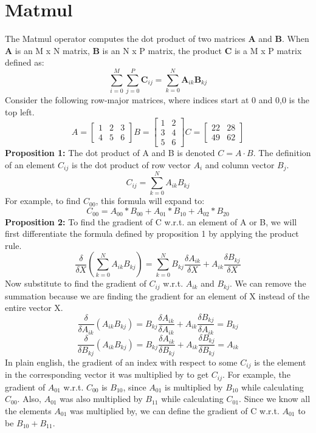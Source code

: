 \documentclass{report}
\begin{document}
        \section{Matmul}
            The Matmul operator computes the dot product of two matrices \textbf{A} and \textbf{B}. When \textbf{A} is an M x N 
            matrix, \textbf{B} is an N x P matrix, the product \textbf{C} is a M x P matrix defined as: 
            $$\sum_{i=0}^{M}\sum_{j=0}^{P}\boldsymbol{C}_{ij} = \sum_{k=0}^{N} \boldsymbol{A}_{ik}\boldsymbol{B}_{kj}$$
            Consider the following row-major matrices, where indices start at 0 and 0,0 is the top left. 
            $$
                A = \begin{bmatrix}1 & 2 & 3\\ 4 & 5 & 6 \end{bmatrix}
                B = \begin{bmatrix}1 & 2 \\ 3 & 4 \\ 5 & 6 \end{bmatrix}
                C = \begin{bmatrix} 22 & 28 \\ 49 & 62\end{bmatrix}
            $$
            \textbf{Proposition 1:}
            The dot product of A and B is denoted $C = A \cdot B$. The definition of an element $C_{ij}$ is the dot product of row vector $A_i$ and column vector $B_j$. 
            $$C_{ij} = \sum_{k=0}^{N} A_{ik}B_{kj}$$
            For example, to find $C_{00}$, this formula will expand to:
            $$C_{00} = A_{00} * B_{00} + A_{01} * B_{10} + A_{02} * B_{20}$$
            \textbf{Proposition 2:}
            To find the gradient of C w.r.t. an element of A or B, we will first differentiate the formula defined by proposition 1 by applying the product rule.
            $$\frac{\delta}{\delta{X}}(\sum_{k=0}^{N}A_{ik} B_{kj}) = \sum_{k=0}^{N} B_{kj} \frac{\delta{A_{ik}}}{\delta{X}} + A_{ik} \frac{\delta{B_{kj}}}{\delta{X}}$$ 
            Now substitute to find the gradient of $C_{ij}$ w.r.t. $A_{ik}$ and $B_{kj}$. We can remove the summation because we are finding the gradient for an element 
            of X instead of the entire vector X. 
            $$\frac{\delta}{\delta{A_{ik}}}(A_{ik} B_{kj}) = B_{kj} \frac{\delta{A_{ik}}}{\delta{A_{ik}}} + A_{ik} \frac{\delta{B_{kj}}}{\delta{A_{ik}}} = B_{kj}$$ 
            $$\frac{\delta}{\delta{B_{kj}}}(A_{ik} B_{kj}) = B_{kj} \frac{\delta{A_{ik}}}{\delta{B_{kj}}} + A_{ik} \frac{\delta{B_{kj}}}{\delta{B_{kj}}} = A_{ik}$$ 
            In plain english, the gradient of an index with respect to some $C_{ij}$ is the element in the corresponding vector it was multiplied by to get $C_{ij}$.  
            For example, the gradient
            of $A_{01}$ w.r.t. $C_{00}$ is $B_{10}$, since $A_{01}$ is multiplied by $B_{10}$ while calculating $C_{00}$. Also, $A_{01}$ was also multiplied by 
            $B_{11}$ while calculating
            $C_{01}$. Since we know all the elements $A_{01}$ was multiplied by, we can define the gradient of C w.r.t. $A_{01}$ to be $B_{10} + B_{11}$. 
\end{document}
